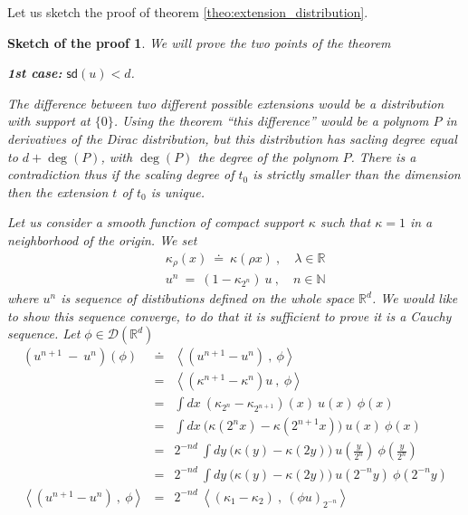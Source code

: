 \documentclass[11pt]{book}
\newcommand{\sd}{\mathsf{sd}}
\newcommand{\sm}[1]{\left\langle#1\right\rangle}
\newcommand{\Dcal}{\mathcal{D}}
\newcommand{\Nbb}{\mathbb{N}}
\newcommand{\Rbb}{\mathbb{R}}
\theoremstyle{break}
\newtheorem{sketch}{Sketch of the proof}[chapter]
\begin{document}
Let us sketch the proof of theorem \ref{theo:extension_distribution}.


\begin{sketch}
We will prove the two points of the theorem %
 \begin{center}
  \textbf{1st case:} $\sd(u)<d$. %
 \end{center}
 The difference between two different possible extensions would be a distribution with support at $\{0\}$. Using the theorem %
 ``this difference'' would be a polynom $P$ in derivatives of the Dirac distribution, but this distribution has sacling degree equal to $d+\deg(P)$, with $\deg(P)$ the degree of the polynom $P$. There is a contradiction thus if the scaling degree of $t_0$ is strictly smaller than the dimension then the extension $t$ of $t_0$ is unique.\par
 Let us consider a smooth function of compact support $\kappa$ such that $\kappa=1$ in a neighborhood of the origin. We set
 \begin{eqnarray*}
  && \kappa_\rho(x) \ \doteq \ \kappa(\rho x) \ , \quad \lambda \in \Rbb \\
  && u^n \ = \ (1-\kappa_{2^n}) \ u \ , \quad n \in \Nbb
 \end{eqnarray*}
 where $u^n$ is sequence of distibutions defined on the whole space $\Rbb^d$. We would like to show this sequence converge, to do that it is sufficient to prove it is a Cauchy sequence. Let $\phi \in \Dcal(\Rbb^d)$ 
 \begin{eqnarray*}
  \left( u^{n+1} \ - \ u^n \right)(\phi) &\doteq& \sm{\left(u^{n+1} - u^n\right) \ , \ \phi} \\
  &=& \sm{\left(\kappa^{n+1} - \kappa^n\right) u \ , \ \phi} \\
  &=& \int dx \ \left(\kappa_{2^n} - \kappa_{2^{n+1}}\right)(x) \ u(x) \ \phi(x) \\
  &=& \int dx \ \bigg(\kappa(2^n x) - \kappa(2^{n+1} x)\bigg) \ u(x) \ \phi(x) \\
  &=& 2^{-nd} \ \int dy \ \bigg(\kappa(y) - \kappa(2 y)\bigg) \ u\left(\frac{y}{2^n}\right) \ \phi\left(\frac{y}{2^n}\right) \\ 
  &=& 2^{-nd} \ \int dy \ \bigg(\kappa(y) - \kappa(2 y)\bigg) \ u\left(2^{-n} y \right) \ \phi\left(2^{-n} y\right) \\
  \sm{\left(u^{n+1} - u^n\right) \ , \ \phi} &=& 2^{-nd} \ \sm{\left(\kappa_1 - \kappa_2\right) \ , \ (\phi u)_{2^{-n}} }
 \end{eqnarray*}

\end{sketch}
\end{document}
